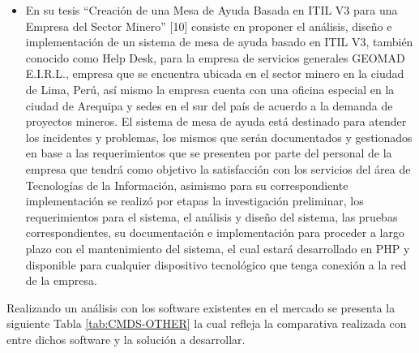 \begin{itemize}
	\item En su tesis “Creación de una Mesa de Ayuda Basada en ITIL V3 para una Empresa del Sector Minero” [10] consiste en proponer el análisis, diseño e implementación de un sistema de mesa de ayuda basado en ITIL V3, también conocido como Help Desk, para la empresa de servicios generales GEOMAD E.I.R.L., empresa que se encuentra ubicada en el sector minero en la ciudad de Lima, Perú, así mismo la empresa cuenta con una oficina especial en la ciudad de Arequipa y sedes en el sur del país de acuerdo a la demanda de proyectos mineros. El sistema de mesa de ayuda está destinado para atender los incidentes y problemas, los mismos que serán documentados y gestionados en base a las requerimientos que se presenten por parte del personal de la empresa que tendrá como objetivo la satisfacción con los servicios del área de Tecnologías de la Información, asimismo para su correspondiente implementación se realizó por etapas la investigación preliminar, los requerimientos para el sistema, el análisis y diseño del sistema, las pruebas correspondientes, su documentación e implementación para proceder a largo plazo con el mantenimiento del sistema, el cual estará desarrollado en PHP y disponible para cualquier dispositivo tecnológico que tenga conexión a la red de la empresa.
	
	

\end{itemize}


Realizando un análisis con los software  existentes en el mercado se presenta la siguiente Tabla \ref{tab:CMDS-OTHER} la cual refleja la comparativa realizada con entre dichos software y la solución a desarrollar.

